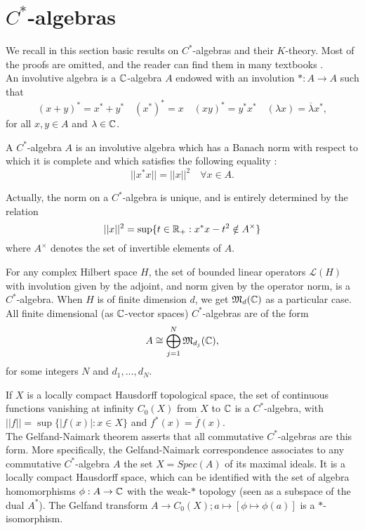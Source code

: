 \section{$C^*$-algebras} %

We recall in this section basic results on $C^*$-algebras and their $K$-theory. Most of the proofs are omitted, and the reader can find them in many textbooks \cite{Murphy}\cite{WeggeOlsen}.\\

An involutive algebra is a $\mathbb C$-algebra $A$ endowed with an involution $* : A\rightarrow A$ such that 
\[ (x+y)^*=x^*+y^* \quad (x^*)^* =x \quad (xy)^* = y^* x^* \quad (\lambda x ) = \overline{\lambda}x^*,\]
for all $x,y\in A$ and $\lambda\in\mathbb C$.
 
\begin{definition}
A $C^*$-algebra $A$ is an involutive algebra which has a Banach norm with respect to which it is complete and which satisfies the following equality :
\[ || x^* x || = || x ||^2\quad \forall x\in A. \]
\end{definition}

Actually, the norm on a $C^*$-algebra is unique, and is entirely determined by the relation
\[ ||x||^2 = \sup \{t\in \mathbb R_+ : x^*x-t^2 \notin A^{\times}\} \]
where $A^\times$ denotes the set of invertible elements of $A$.

\begin{Expl}
For any complex Hilbert space $H$, the set of bounded linear operators $\mathcal L(H)$ with involution given by the adjoint, and norm given by the operator norm, is a $C^*$-algebra. When $H$ is of finite dimension $d$, we get $\mathfrak M_d(\mathbb C)$ as a particular case.\\

All finite dimensional (as $\mathbb C$-vector spaces) $C^*$-algebras are of the form
\[A \cong \bigoplus_{j=1}^N \mathfrak M_{d_j}(\mathbb C),\]
for some integers $N$ and $d_1,...,d_N$.
\end{Expl}

\begin{Expl}
If $X$ is a locally compact Hausdorff topological space, the set of continuous functions vanishing at infinity $C_0(X)$ from $X$ to $\mathbb C$ is a $C^*$-algebra, with $||f||=\sup\{|f(x)| : x\in X\}$ and $f^*(x)=\overline f(x)$.\\

The Gelfand-Naimark theorem asserts that all commutative $C^*$-algebras are this form. More specifically, the Gelfand-Naimark correspondence associates to any commutative $C^*$-algebra $A$ the set $X=Spec(A)$ of its maximal ideals. It is a locally compact Hausdorff space, which can be identified with the set of algebra homomorphisms $\phi : A\rightarrow \mathbb C$ with the weak-$*$ topology (seen as a subspace of the dual $A^*$). The Gelfand transform $A\rightarrow C_0(X) ; a \mapsto [\phi\mapsto \phi(a)]$ is a $*$-isomorphism.
\end{Expl}

